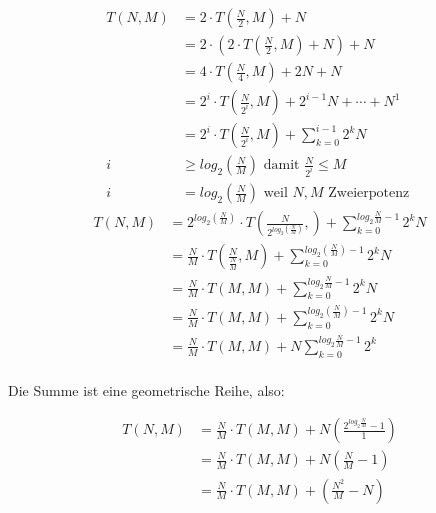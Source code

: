 \documentclass[parskip=half,a4paper]{scrartcl}
\begin{document}
\begin{equation}
\begin{aligned}
    T(N, M) & =  2 \cdot T\left(\frac{N}{2}, M\right) + N\\
    & =  2 \cdot \left(2 \cdot T\left(\frac{N}{2}, M\right) + N\right) + N\\
    & =  4 \cdot T\left(\frac{N}{4}, M\right) + 2N + N\\
    & =  2^i \cdot T\left(\frac{N}{2^i}, M\right) + 2^{i-1}N + \cdots + N^{1}\\
    & =  2^i \cdot T\left(\frac{N}{2^i}, M\right) + \sum_{k=0}^{i-1} 2^kN \\
    i & \ge log_2\left(\frac{N}{M}\right) \text{ damit } \frac{N}{2^i} \le M \\
    i & = log_2\left(\frac{N}{M}\right) \text{ weil $N,M$ Zweierpotenz }
\end{aligned}
\end{equation}
\begin{equation}
\begin{aligned}
    T(N, M) & =  2^{log_2\left(\frac{N}{M}\right)} \cdot T\left(\frac{N}{2^{log_2\left(\frac{N}{M}\right)}}, \right) + \sum_{k=0}^{log_2\frac{N}{M}-1}{2^kN} \\
    & =  \frac{N}{M} \cdot T(\frac{N}{\frac{N}{M}}, M) + \sum_{k=0}^{log_2(\frac{N}{M})-1} 2^kN \\
    & =  \frac{N}{M} \cdot T(M, M) + \sum_{k=0}^{log_2\frac{N}{M}-1} 2^kN \\
    & =  \frac{N}{M} \cdot T(M, M) + \sum_{k=0}^{log_2(\frac{N}{M})-1} 2^kN \\
    & =  \frac{N}{M} \cdot T(M, M) + N \sum_{k=0}^{log_2\frac{N}{M}-1} 2^k \\
\end{aligned}
\end{equation}
\begin{center}
Die Summe ist eine geometrische Reihe, also:
\end{center}
\begin{equation}
\begin{aligned}
    T(N, M) & =  \frac{N}{M} \cdot T(M, M) + N \left(\frac{2^{log_2\frac{N}{M}} - 1}{1}\right) \\
    & =  \frac{N}{M} \cdot T(M, M) + N \left(\frac{N}{M} - 1\right) \\
    & =  \frac{N}{M} \cdot T(M, M) + \left(\frac{N^2}{M} - N\right)
\end{aligned}
\end{equation}
\end{document}
